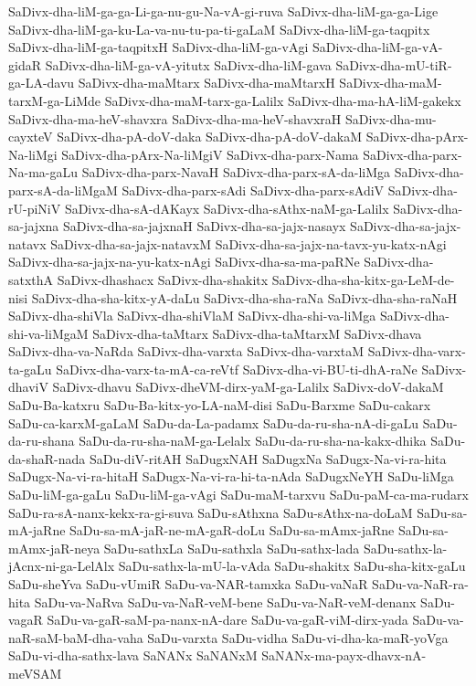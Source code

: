 {SaDivx-dha-liM-ga-ga-Li-ga-nu-gu-Na-vA-gi-ruva
SaDivx-dha-liM-ga-ga-Lige
SaDivx-dha-liM-ga-ku-La-va-nu-tu-pa-ti-gaLaM
SaDivx-dha-liM-ga-taqpitx
SaDivx-dha-liM-ga-taqpitxH
SaDivx-dha-liM-ga-vAgi
SaDivx-dha-liM-ga-vA-gidaR
SaDivx-dha-liM-ga-vA-yitutx
SaDivx-dha-liM-gava
SaDivx-dha-mU-tiR-ga-LA-davu
SaDivx-dha-maMtarx
SaDivx-dha-maMtarxH
SaDivx-dha-maM-tarxM-ga-LiMde
SaDivx-dha-maM-tarx-ga-Lalilx
SaDivx-dha-ma-hA-liM-gakekx
SaDivx-dha-ma-heV-shavxra
SaDivx-dha-ma-heV-shavxraH
SaDivx-dha-mu-cayxteV
SaDivx-dha-pA-doV-daka
SaDivx-dha-pA-doV-dakaM
SaDivx-dha-pArx-Na-liMgi
SaDivx-dha-pArx-Na-liMgiV
SaDivx-dha-parx-Nama
SaDivx-dha-parx-Na-ma-gaLu
SaDivx-dha-parx-NavaH
SaDivx-dha-parx-sA-da-liMga
SaDivx-dha-parx-sA-da-liMgaM
SaDivx-dha-parx-sAdi
SaDivx-dha-parx-sAdiV
SaDivx-dha-rU-piNiV
SaDivx-dha-sA-dAKayx
SaDivx-dha-sAthx-naM-ga-Lalilx
SaDivx-dha-sa-jajxna
SaDivx-dha-sa-jajxnaH
SaDivx-dha-sa-jajx-nasayx
SaDivx-dha-sa-jajx-natavx
SaDivx-dha-sa-jajx-natavxM
SaDivx-dha-sa-jajx-na-tavx-yu-katx-nAgi
SaDivx-dha-sa-jajx-na-yu-katx-nAgi
SaDivx-dha-sa-ma-paRNe
SaDivx-dha-satxthA
SaDivx-dhashacx
SaDivx-dha-shakitx
SaDivx-dha-sha-kitx-ga-LeM-de-nisi
SaDivx-dha-sha-kitx-yA-daLu
SaDivx-dha-sha-raNa
SaDivx-dha-sha-raNaH
SaDivx-dha-shiVla
SaDivx-dha-shiVlaM
SaDivx-dha-shi-va-liMga
SaDivx-dha-shi-va-liMgaM
SaDivx-dha-taMtarx
SaDivx-dha-taMtarxM
SaDivx-dhava
SaDivx-dha-va-NaRda
SaDivx-dha-varxta
SaDivx-dha-varxtaM
SaDivx-dha-varx-ta-gaLu
SaDivx-dha-varx-ta-mA-ca-reVtf
SaDivx-dha-vi-BU-ti-dhA-raNe
SaDivx-dhaviV
SaDivx-dhavu
SaDivx-dheVM-dirx-yaM-ga-Lalilx
SaDivx-doV-dakaM
SaDu-Ba-katxru
SaDu-Ba-kitx-yo-LA-naM-disi
SaDu-Barxme
SaDu-cakarx
SaDu-ca-karxM-gaLaM
SaDu-da-La-padamx
SaDu-da-ru-sha-nA-di-gaLu
SaDu-da-ru-shana
SaDu-da-ru-sha-naM-ga-Lelalx
SaDu-da-ru-sha-na-kakx-dhika
SaDu-da-shaR-nada
SaDu-diV-ritAH
SaDugxNAH
SaDugxNa
SaDugx-Na-vi-ra-hita
SaDugx-Na-vi-ra-hitaH
SaDugx-Na-vi-ra-hi-ta-nAda
SaDugxNeYH
SaDu-liMga
SaDu-liM-ga-gaLu
SaDu-liM-ga-vAgi
SaDu-maM-tarxvu
SaDu-paM-ca-ma-rudarx
SaDu-ra-sA-nanx-kekx-ra-gi-suva
SaDu-sAthxna
SaDu-sAthx-na-doLaM
SaDu-sa-mA-jaRne
SaDu-sa-mA-jaR-ne-mA-gaR-doLu
SaDu-sa-mAmx-jaRne
SaDu-sa-mAmx-jaR-neya
SaDu-sathxLa
SaDu-sathxla
SaDu-sathx-lada
SaDu-sathx-la-jAcnx-ni-ga-LelAlx
SaDu-sathx-la-mU-la-vAda
SaDu-shakitx
SaDu-sha-kitx-gaLu
SaDu-sheYva
SaDu-vUmiR
SaDu-va-NAR-tamxka
SaDu-vaNaR
SaDu-va-NaR-ra-hita
SaDu-va-NaRva
SaDu-va-NaR-veM-bene
SaDu-va-NaR-veM-denanx
SaDu-vagaR
SaDu-va-gaR-saM-pa-nanx-nA-dare
SaDu-va-gaR-viM-dirx-yada
SaDu-va-naR-saM-baM-dha-vaha
SaDu-varxta
SaDu-vidha
SaDu-vi-dha-ka-maR-yoVga
SaDu-vi-dha-sathx-lava
SaNANx
SaNANxM
SaNANx-ma-payx-dhavx-nA-meVSAM
}
